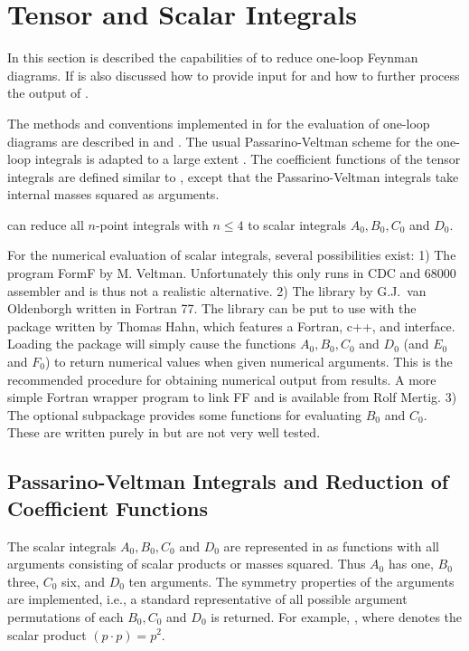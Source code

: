 \section{Tensor and Scalar Integrals}

In this section is described the capabilities of \fc to reduce one-loop Feynman diagrams.
If is also discussed how to provide input for \fc and how to further process the output of \fc.

The methods and conventions implemented in \fc for the evaluation of one-loop diagrams are
described in \cite{ansgar} and \cite{feyncalc}. The usual Passarino-Veltman scheme for the
one-loop integrals is adapted to a large extent \cite{ansgar}.  The coefficient functions of the
tensor integrals are defined  similar to \cite{ansgar}, except that the Passarino-Veltman
integrals take internal masses squared  as arguments.

\fc can reduce all $n$-point integrals with $n\leq 4$ to scalar integrals $A_0, B_0, C_0$ and
$D_0$.

For the numerical evaluation of scalar integrals, several possibilities exist: 1) The program
FormF by M. Veltman. Unfortunately this only runs in CDC and 68000 assembler and is thus not a
realistic alternative. 2) The library \FF by G.J.~van Oldenborgh \cite{Ol91} written in Fortran
77. The library can be put to use with the \lpts package \cite{Hahn:1998yk} written by Thomas
Hahn, which features a Fortran, c++, and \mma interface. Loading the \mma package will simply
cause the functions $A_0, B_0, C_0$ and $D_0$ (and $E_0$ and $F_0$) to return numerical values
when given numerical arguments. This is the recommended procedure for obtaining numerical output
from \fc results. A more simple Fortran wrapper program to link FF and \fc is available from Rolf
Mertig. 3) The optional subpackage \fphi provides some functions for evaluating $B_0$ and $C_0$.
These are written purely in \mma but are not very well tested.

\subsection{Passarino-Veltman Integrals and Reduction of Coefficient Functions}
\label{passvelt}

The scalar integrals $A_0, B_0, C_0$ and $D_0$ are represented
in \fc as functions with all arguments consisting of scalar products or
masses squared. Thus $A_0$ has one, $B_0$ three, $C_0$ six, and
$D_0$ ten arguments. The symmetry properties of the arguments  are
implemented, i.e., a standard representative of all possible
argument permutations of each $ B_0, C_0$ and $D_0$ is returned.
For example,  \ra {}, where
 denotes the scalar product $(p\cdot p) = p^2$.

